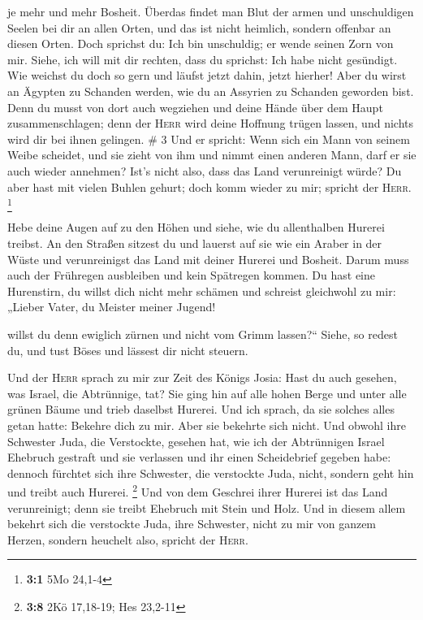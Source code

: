 je mehr und mehr Bosheit.  Überdas findet man Blut der
armen und unschuldigen Seelen bei dir an allen Orten, und das ist nicht
heimlich, sondern offenbar an diesen Orten.  Doch
sprichst du: Ich bin unschuldig; er wende seinen Zorn von mir. Siehe,
ich will mit dir rechten, dass du sprichst: Ich habe nicht gesündigt.
 Wie weichst du doch so gern und läufst jetzt dahin,
jetzt hierher! Aber du wirst an Ägypten zu Schanden werden, wie du an
Assyrien zu Schanden geworden bist.  Denn du musst von
dort auch wegziehen und deine Hände über dem Haupt zusammenschlagen;
denn der \textsc{Herr} wird deine Hoffnung trügen lassen, und nichts
wird dir bei ihnen gelingen. \# 3  Und er spricht: Wenn
sich ein Mann von seinem Weibe scheidet, und sie zieht von ihm und nimmt
einen anderen Mann, darf er sie auch wieder annehmen? Ist's nicht also,
dass das Land verunreinigt würde? Du aber hast mit vielen Buhlen gehurt;
doch komm wieder zu mir; spricht der \textsc{Herr}. \footnote{\textbf{3:1}
  5Mo 24,1-4}

 Hebe deine Augen auf zu den Höhen und siehe, wie du
allenthalben Hurerei treibst. An den Straßen sitzest du und lauerst auf
sie wie ein Araber in der Wüste und verunreinigst das Land mit deiner
Hurerei und Bosheit.  Darum muss auch der Frühregen
ausbleiben und kein Spätregen kommen. Du hast eine Hurenstirn, du willst
dich nicht mehr schämen  und schreist gleichwohl zu mir:
„Lieber Vater, du Meister meiner Jugend!

 willst du denn ewiglich zürnen und nicht vom Grimm
lassen?{}`` Siehe, so redest du, und tust Böses und lässest dir nicht
steuern.

 Und der \textsc{Herr} sprach zu mir zur Zeit des Königs
Josia: Hast du auch gesehen, was Israel, die Abtrünnige, tat? Sie ging
hin auf alle hohen Berge und unter alle grünen Bäume und trieb daselbst
Hurerei.  Und ich sprach, da sie solches alles getan
hatte: Bekehre dich zu mir. Aber sie bekehrte sich nicht. Und obwohl
ihre Schwester Juda, die Verstockte, gesehen hat,  wie ich
der Abtrünnigen Israel Ehebruch gestraft und sie verlassen und ihr einen
Scheidebrief gegeben habe: dennoch fürchtet sich ihre Schwester, die
verstockte Juda, nicht, sondern geht hin und treibt auch Hurerei.
\footnote{\textbf{3:8} 2Kö 17,18-19; Hes 23,2-11}  Und von
dem Geschrei ihrer Hurerei ist das Land verunreinigt; denn sie treibt
Ehebruch mit Stein und Holz.  Und in diesem allem bekehrt
sich die verstockte Juda, ihre Schwester, nicht zu mir von ganzem
Herzen, sondern heuchelt also, spricht der \textsc{Herr}.


